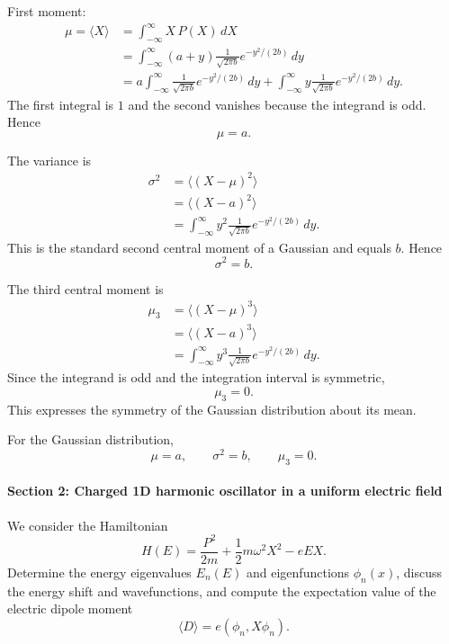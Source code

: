 \documentclass[11pt,a4paper]{scrartcl}
\begin{document}
\begin{enumerate}[label=(\alph*)]
\begin{calculationbox}
    First moment:
    \begin{align*}
        \mu=\langle X\rangle
        &= \int_{-\infty}^{\infty} X\,P(X)\,dX \\
        &= \int_{-\infty}^{\infty} (a+y)\frac{1}{\sqrt{2\pi b}}e^{-y^2/(2b)}\,dy \\
        &= a\int_{-\infty}^{\infty}\frac{1}{\sqrt{2\pi b}}e^{-y^2/(2b)}\,dy
        + \int_{-\infty}^{\infty} y\frac{1}{\sqrt{2\pi b}}e^{-y^2/(2b)}\,dy.
    \end{align*}
    The first integral is $1$ and the second vanishes because the integrand is odd. Hence
    \[
    \mu=a.
    \]

    The variance is
    \begin{align*}
        \sigma^2
        &= \langle (X-\mu)^2\rangle \\
        &= \langle (X-a)^2\rangle \\
        &= \int_{-\infty}^{\infty} y^2 \frac{1}{\sqrt{2\pi b}} e^{-y^2/(2b)}\,dy.
    \end{align*}
    This is the standard second central moment of a Gaussian and equals $b$. Hence
    \[
    \sigma^2=b.
    \]

    The third central moment is
    \begin{align*}
        \mu_3
        &= \langle (X-\mu)^3\rangle \\
        &= \langle (X-a)^3\rangle \\
        &= \int_{-\infty}^{\infty} y^3 \frac{1}{\sqrt{2\pi b}} e^{-y^2/(2b)}\,dy.
    \end{align*}
    Since the integrand is odd and the integration interval is symmetric,
    \[
    \mu_3=0.
    \]
    This expresses the symmetry of the Gaussian distribution about its mean.
    \end{calculationbox}

    \begin{answerbox}
    For the Gaussian distribution,
    \[
    \boxed{\mu=a,\qquad \sigma^2=b,\qquad \mu_3=0.}
    \]
    \end{answerbox}
\end{enumerate}

\paragraph{Section 2: Charged 1D harmonic oscillator in a uniform electric field}

We consider the Hamiltonian
\[
H(E)=\frac{P^2}{2m}+\frac12 m\omega^2 X^2-eEX.
\]
Determine the energy eigenvalues $E_n(E)$ and eigenfunctions $\phi_n(x)$, discuss the energy shift and wavefunctions, and compute the expectation value of the electric dipole moment
\[
\langle D\rangle=e(\phi_n,X\phi_n).
\]
\end{document}
